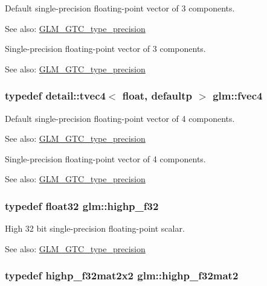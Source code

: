 Default single-precision floating-point vector of 3 components. \begin{Desc}
\item[See also:]\hyperlink{group__gtc__type__precision}{GLM\_\-GTC\_\-type\_\-precision}\end{Desc}
Single-precision floating-point vector of 3 components. \begin{Desc}
\item[See also:]\hyperlink{group__gtc__type__precision}{GLM\_\-GTC\_\-type\_\-precision} \end{Desc}
\hypertarget{group__gtc__type__precision_g55d1365630d3b3ecf7c7f4e7c29a9cb1}{
\subsubsection[fvec4]{\setlength{\rightskip}{0pt plus 5cm}typedef detail::tvec4$<$ float, defaultp $>$ {\bf glm::fvec4}}}
\label{group__gtc__type__precision_g55d1365630d3b3ecf7c7f4e7c29a9cb1}


Default single-precision floating-point vector of 4 components. \begin{Desc}
\item[See also:]\hyperlink{group__gtc__type__precision}{GLM\_\-GTC\_\-type\_\-precision}\end{Desc}
Single-precision floating-point vector of 4 components. \begin{Desc}
\item[See also:]\hyperlink{group__gtc__type__precision}{GLM\_\-GTC\_\-type\_\-precision} \end{Desc}
\hypertarget{group__gtc__type__precision_g48d80b6fd3a40b71b2e414493832d1ca}{
\subsubsection[highp\_\-f32]{\setlength{\rightskip}{0pt plus 5cm}typedef float32 {\bf glm::highp\_\-f32}}}
\label{group__gtc__type__precision_g48d80b6fd3a40b71b2e414493832d1ca}


High 32 bit single-precision floating-point scalar. \begin{Desc}
\item[See also:]\hyperlink{group__gtc__type__precision}{GLM\_\-GTC\_\-type\_\-precision} \end{Desc}
\hypertarget{group__gtc__type__precision_ged934f561aaf8ad891c0a8f5e719aea8}{
\subsubsection[highp\_\-f32mat2]{\setlength{\rightskip}{0pt plus 5cm}typedef highp\_\-f32mat2x2 {\bf glm::highp\_\-f32mat2}}}
\label{group__gtc__type__precision_ged934f561aaf8ad891c0a8f5e719aea8}



